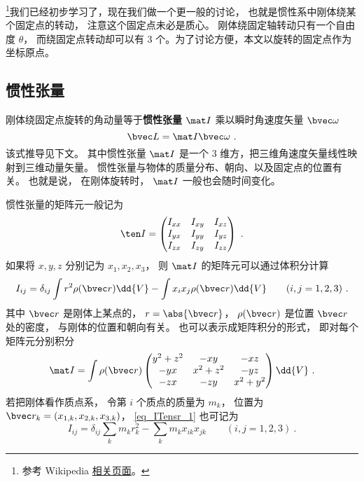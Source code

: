 
\begin{issues}
\issueTODO
\end{issues}


\footnote{参考 Wikipedia \href{https://en.wikipedia.org/wiki/Moment_of_inertia}{相关页面}。}我们已经初步学习了，现在我们做一个更一般的讨论， 也就是惯性系中刚体绕某个固定点的转动， 注意这个固定点未必是质心。 刚体绕固定轴转动只有一个自由度 $\theta$， 而绕固定点转动却可以有 3 个。为了讨论方便，本文以旋转的固定点作为坐标原点。

\subsection{惯性张量}
刚体绕固定点旋转的角动量等于\textbf{惯性张量} $\mat I$ 乘以瞬时角速度矢量 $\bvec \omega$
\begin{equation}\label{eq_ITensr_3}
\bvec L = \mat I \bvec \omega~.
\end{equation}
该式推导见下文。 其中惯性张量 $\mat I$ 是一个 3 维方，把三维角速度矢量线性映射到三维动量矢量。 惯性张量与物体的质量分布、朝向、以及固定点的位置有关。 也就是说， 在刚体旋转时， $\mat I$ 一般也会随时间变化。

惯性张量的矩阵元一般记为
\begin{equation}
\ten I = \begin{pmatrix}
I_{xx}& I_{xy}& I_{xz} \\
I_{yx}& I_{yy}& I_{yz} \\
I_{zx}& I_{zy}& I_{zz}
\end{pmatrix}~.
\end{equation}
如果将 $x, y, z$ 分别记为 $x_1, x_2, x_3$， 则 $\mat I$ 的矩阵元可以通过体积分计算
\begin{equation}\label{eq_ITensr_1}
I_{ij} = \delta_{ij} \int r^2 \rho(\bvec r)\dd{V} - \int x_i x_j \rho(\bvec r)\dd{V} \qquad (i, j = 1, 2, 3)~.
\end{equation}
其中 $\bvec r$ 是刚体上某点的， $r = \abs{\bvec r}$， $\rho(\bvec r)$ 是位置 $\bvec r$ 处的密度， 与刚体的位置和朝向有关。 也可以表示成矩阵积分的形式， 即对每个矩阵元分别积分
\begin{equation}\label{eq_ITensr_2}
\mat I = \int \rho(\bvec r)
\begin{pmatrix}
y^2 + z^2 & -xy & -xz\\
-yx & x^2 + z^2 & -yz\\
-zx & -zy & x^2 + y^2
\end{pmatrix}
\dd{V}~.
\end{equation}
若把刚体看作质点系， 令第 $i$ 个质点的质量为 $m_k$， 位置为 $\bvec r_{k} = (x_{1,k},x_{2,k},x_{3,k})$， \autoref{eq_ITensr_1} 也可记为
\begin{equation}\label{eq_ITensr_8}
I_{ij} = \delta_{ij}\sum_k m_k r_k^2 - \sum_k m_k x_{ik}x_{jk} \qquad (i, j = 1, 2, 3)~.
\end{equation}

